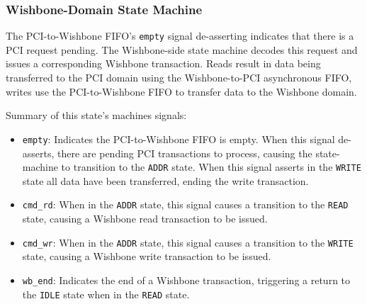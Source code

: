 \subsubsection{Wishbone-Domain State Machine}
The PCI-to-Wishbone FIFO's \texttt{empty} signal de-asserting indicates that
there is a PCI request pending. The Wishbone-side state machine decodes this
request and issues a corresponding Wishbone transaction. Reads result in data
being transferred to the PCI domain using the Wishbone-to-PCI asynchronous FIFO,
writes use the PCI-to-Wishbone FIFO to transfer data to the Wishbone domain.

Summary of this state's machines signals:
\begin{itemize}
  \item \texttt{empty}: Indicates the PCI-to-Wishbone FIFO is empty. When this
  signal de-asserts, there are pending PCI transactions to process, causing the
  state-machine to transition to the \texttt{ADDR} state. When this signal
  asserts in the \texttt{WRITE} state all data have been transferred, ending
  the write transaction.
  \item \texttt{cmd\_rd}: When in the \texttt{ADDR} state, this signal causes a
  transition to the \texttt{READ} state, causing a Wishbone read transaction to
  be issued.
  \item \texttt{cmd\_wr}: When in the \texttt{ADDR} state, this signal causes a
  transition to the \texttt{WRITE} state, causing a Wishbone write transaction
  to be issued.
  \item \texttt{wb\_end}: Indicates the end of a Wishbone transaction,
  triggering a return to the \texttt{IDLE} state when in the \texttt{READ}
  state.
\end{itemize}



